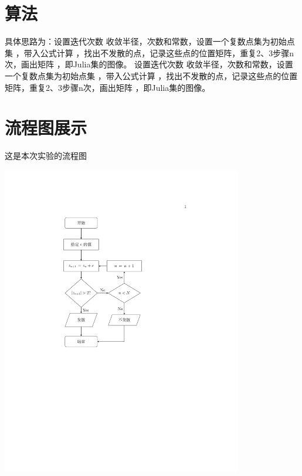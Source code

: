 \documentclass{ctexbeamer}
\begin{document}
\section{算法}  
\begin{frame}
  \begin{center}
\indent 具体思路为：设置迭代次数 收敛半径，次数和常数，设置一个复数点集为初始点集 ，带入公式计算 ，找出不发散的点，记录这些点的位置矩阵，重复2、3步骤n次，画出矩阵 ，即Julia集的图像。 设置迭代次数 收敛半径，次数和常数，设置一个复数点集为初始点集 ，带入公式计算 ，找出不发散的点，记录这些点的位置矩阵，重复2、3步骤n次，画出矩阵 ，即Julia集的图像。
\end{center}
\end{frame}

\section{流程图展示}    

\begin{frame}[t]
这是本次实验的流程图

\includegraphics[width=10.5cm]{./page.pdf}

\end{frame}
\end{document}
